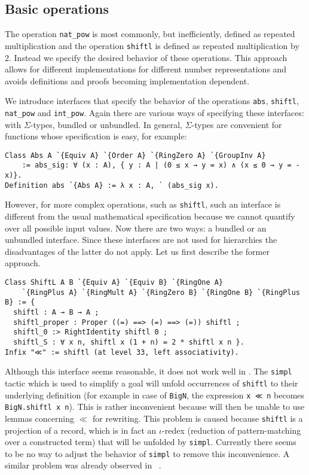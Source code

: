 \documentclass[a4paper,10pt,runningheads]{llncs}
\begin{document}
\subsection{Basic operations}
The operation \lstinline|nat_pow| is most commonly, but inefficiently, defined as repeated multiplication and the operation \lstinline|shiftl| is defined as repeated multiplication by 2. Instead we specify the desired behavior of these operations. This approach allows for different implementations for different number representations and avoids definitions and proofs  becoming implementation dependent.

We introduce interfaces that specify the behavior of the operations \lstinline|abs|, \mbox{\lstinline|shiftl|,} \lstinline|nat_pow| and \lstinline|int_pow|. Again there are various ways of specifying these interfaces: with $\Sigma$-types, bundled or unbundled. In general, \mbox{$\Sigma$-types} are convenient for functions whose specification is easy, for example:
\begin{lstlisting}
Class Abs A `{Equiv A} `{Order A} `{RingZero A} `{GroupInv A} 
	:= abs_sig: ∀ (x : A), { y : A | (0 ≤ x → y = x) ∧ (x ≤ 0 → y = -x)}.
Definition abs `{Abs A} := λ x : A, ` (abs_sig x).
\end{lstlisting} 
However, for more complex operations, such as \lstinline|shiftl|, such an interface is different from the usual mathematical specification because we cannot quantify over all possible input values. Now there are two ways: a bundled or an unbundled interface. Since these interfaces are not used for hierarchies the disadvantages of the latter do not apply. Let us first describe the former approach.
\begin{lstlisting}
Class ShiftL A B `{Equiv A} `{Equiv B} `{RingOne A} 
	`{RingPlus A} `{RingMult A} `{RingZero B} `{RingOne B} `{RingPlus B} := {
  shiftl : A → B → A ;
  shiftl_proper : Proper ((=) ==> (=) ==> (=)) shiftl ;
  shiftl_0 :> RightIdentity shiftl 0 ;
  shiftl_S : ∀ x n, shiftl x (1 + n) = 2 * shiftl x n }.
Infix "≪" := shiftl (at level 33, left associativity).
\end{lstlisting}
Although this interface seems reasonable, it does not work well in \Coq. The \lstinline|simpl| tactic which is used to simplify a goal will unfold occurrences of \lstinline|shiftl| to their underlying definition (for example in case of \lstinline|BigN|, the expression \lstinline|x ≪ n| becomes \lstinline|BigN.shiftl x n|). This is rather inconvenient because \Coq{} will then be unable to use lemmas concerning $≪$ for rewriting. This problem is caused because \lstinline|shiftl| is a projection of a record, which is in fact an $ι$-redex (reduction of pattern-matching over a constructed term) that will be unfolded by \lstinline|simpl|. Currently there seems to be no way to adjust the behavior of \lstinline|simpl| to remove this inconvenience. A similar problem was already observed in \Ssreflect~\cite{ssr}.
\end{document}
